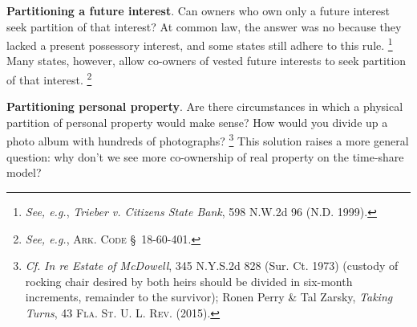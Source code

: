 \item \textbf{Partitioning a future interest}. Can owners who own only a future
interest seek partition of that interest? At common law, the answer was no
because they lacked a present possessory interest, and some states still adhere
to this rule. \footnote{\emph{See, e.g.}, \emph{Trieber v. Citizens State Bank},
598 N.W.2d 96 (N.D. 1999).} Many states, however, allow co-owners of vested
future interests to seek partition of that interest. \footnote{\emph{See, e.g.},
\textsc{Ark. Code} \S~18-60-401.}

\item \textbf{Partitioning personal property}. Are there circumstances in which
a physical partition of personal property would make sense? How would you
divide up a photo album with hundreds of photographs? \footnote{\textit{Cf.}
\emph{In re Estate of McDowell}, 345 N.Y.S.2d 828 (Sur. Ct. 1973) (custody of
rocking chair desired by both heirs should be divided in six-month increments,
remainder to the survivor); Ronen Perry \& Tal Zarsky, \textit{Taking Turns}, 43
\textsc{Fla. St. U. L. Rev.} (2015).} This solution raises a more general
question: why don't we see more co-ownership of real property on the time-share
model?

